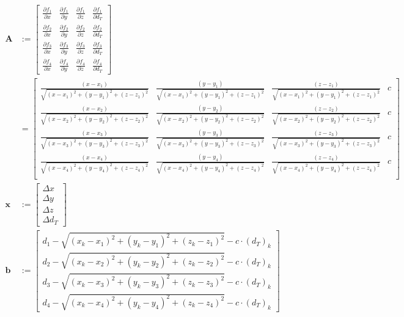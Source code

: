 \documentclass[a4paper,twoside,12pt]{memoir} %
\begin{document}
\begin{align}
\mathbf{A} & := \begin{bmatrix}
\frac{\partial f_1}{\partial x} &
\frac{\partial f_1}{\partial y} &
\frac{\partial f_1}{\partial z} &
\frac{\partial f_1}{\partial d_T} \\
\frac{\partial f_2}{\partial x} &
\frac{\partial f_2}{\partial y} &
\frac{\partial f_2}{\partial z} &
\frac{\partial f_2}{\partial d_T} \\
\frac{\partial f_3}{\partial x} &
\frac{\partial f_3}{\partial y} &
\frac{\partial f_3}{\partial z} &
\frac{\partial f_3}{\partial d_T} \\
\frac{\partial f_4}{\partial x} &
\frac{\partial f_4}{\partial y} &
\frac{\partial f_4}{\partial z} &
\frac{\partial f_4}{\partial d_T}
\end{bmatrix} \\
& = \begin{bmatrix}
\frac{(x-x_1)}{\sqrt{(x-x_1)^{2}+(y-y_1)^{2}+(z-z_1)^{2}}} & \frac{(y-y_1)}{\sqrt{(x-x_1)^{2}+(y-y_1)^{2}+(z-z_1)^{2}}} & \frac{(z-z_1)}{\sqrt{(x-x_1)^{2}+(y-y_1)^{2}+(z-z_1)^{2}}} & c \\
\frac{(x-x_2)}{\sqrt{(x-x_2)^{2}+(y-y_2)^{2}+(z-z_2)^{2}}} & \frac{(y-y_2)}{\sqrt{(x-x_2)^{2}+(y-y_2)^{2}+(z-z_2)^{2}}} & \frac{(z-z_2)}{\sqrt{(x-x_2)^{2}+(y-y_2)^{2}+(z-z_2)^{2}}} & c \\
\frac{(x-x_3)}{\sqrt{(x-x_3)^{2}+(y-y_3)^{2}+(z-z_3)^{2}}} & \frac{(y-y_3)}{\sqrt{(x-x_3)^{2}+(y-y_3)^{2}+(z-z_3)^{2}}} & \frac{(z-z_3)}{\sqrt{(x-x_3)^{2}+(y-y_3)^{2}+(z-z_3)^{2}}} & c \\
\frac{(x-x_4)}{\sqrt{(x-x_4)^{2}+(y-y_4)^{2}+(z-z_4)^{2}}} & \frac{(y-y_4)}{\sqrt{(x-x_4)^{2}+(y-y_4)^{2}+(z-z_4)^{2}}} & \frac{(z-z_4)}{\sqrt{(x-x_4)^{2}+(y-y_4)^{2}+(z-z_4)^{2}}} & c \\
\end{bmatrix}\\
\mathbf{x} & :=  \begin{bmatrix}
\Delta x \\
\Delta y \\
\Delta z \\
\Delta d_T
\end{bmatrix}\\
\mathbf{b} & := \begin{bmatrix}
d_1 - \sqrt{(x_k-x_1)^{2}+(y_k-y_1)^{2}+(z_k-z_1)^{2}} - c\cdot (d_T)_k \\
d_2 - \sqrt{(x_k-x_2)^{2}+(y_k-y_2)^{2}+(z_k-z_2)^{2}} - c\cdot (d_T)_k \\
d_3 - \sqrt{(x_k-x_3)^{2}+(y_k-y_3)^{2}+(z_k-z_3)^{2}} - c\cdot (d_T)_k \\
d_4 - \sqrt{(x_k-x_4)^{2}+(y_k-y_4)^{2}+(z_k-z_4)^{2}} - c\cdot (d_T)_k
\end{bmatrix}
\end{align}%
\end{document}
